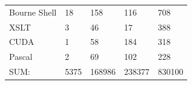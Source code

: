 \begin{appendix}
\begin{table}[htbp]
\begin{longtable}{ l|l|l|l|l }
        Bourne Shell                   &  18          &  158         &   116        &    708\\
        XSLT                           &   3          &   46         &    17        &    388\\
        CUDA                           &   1          &   58         &   184        &    318\\
        Pascal                         &   2          &   69         &   102        &    228\\
        \hline
        SUM:                           &5375         &168986         &238377         &830100\\
        \hline
    \end{longtable}
    \label{table:ParaviewStatistic}
\end{table}


\end{appendix}
